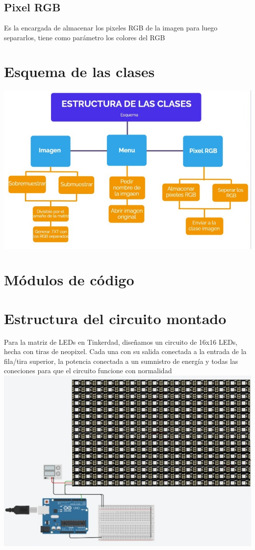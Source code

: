\documentclass{article}
\begin{document}
\subsection{Pixel RGB}
Es la encargada de almacenar los pixeles RGB de la imagen para luego separarlos, tiene como parámetro los colores del RGB\\

\section{Esquema de las clases}
\includegraphics[width=14cm]{Imagenes/clases.jpeg}

\section{Módulos de código}

\section{Estructura del circuito montado}
Para la matriz de LEDs en Tinkerdad, diseñamos un circuito de 16x16 LEDs, hecha con tiras de neopixel. Cada una con su salida conectada a la entrada de la fila/tira superior, la potencia conectada a un sumnistro de energía y todas las coneciones para que el circuito funcione con normalidad\\

\includegraphics[width=14cm]{Imagenes/circuito.jpeg}
\end{document}
